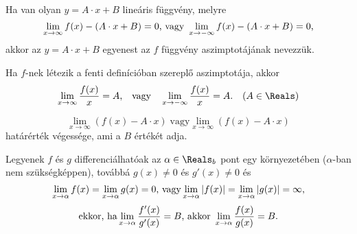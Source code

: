 \begin{definition}
  Ha van olyan $y=A\cdot x+B$ lineáris függvény, melyre
  \[
    \lim\limits_{x \rightarrow \infty} f(x)-(A\cdot x+B)=0
    \text{, vagy }
    \lim\limits_{x \rightarrow -\infty} f(x)-(A\cdot x+B)=0
    \text,
  \]
  akkor az $y=A\cdot x+B$ egyenest az $f$ függvény aszimptotájának nevezzük.
\end{definition}

\begin{note}

  Ha $f$-nek létezik a fenti definícióban szereplő aszimptotája, akkor
  \[
    \lim_{x \rightarrow \infty} \frac{f(x)}{x}=A
    \text,
    \quad\text{vagy}\quad
    \lim_{x \rightarrow -\infty} \frac{f(x)}{x}=A
    \text.
    \quad
    (A \in \Reals)
  \]
\end{note}
\begin{note}
  \[
    \lim\limits_{x \rightarrow \infty} (f(x)-A\cdot x)\; \text{vagy}
    \lim\limits_{x \rightarrow \infty} (f(x)-A\cdot x)
  \]
  határérték végessége, ami a $B$ értékét adja.
\end{note}

\begin{theorem}
  Legyenek $f$ és $g$ differenciálhatóak az $\alpha \in \Reals_b$ pont egy
  környezetében ($\alpha$-ban nem szükségképpen), továbbá $g(x) \neq 0$ és
  $g'(x) \neq 0$ és
  \[
    \lim\limits_{x \rightarrow \alpha} f(x) = \lim\limits_{x \rightarrow \alpha} g(x)=0
    \text{, vagy}
    \lim\limits_{x \rightarrow \alpha} |f(x)|=\lim\limits_{x \rightarrow \alpha}|g(x)|=\infty
    \text,
  \]
  \[
    \text{ekkor, ha}
    \lim\limits_{x \rightarrow \alpha} \frac{f'(x)}{g'(x)}=B
    \text{, akkor }
    \lim\limits_{x \rightarrow \alpha} \frac{f(x)}{g(x)}=B
    \text.
  \]
\end{theorem}